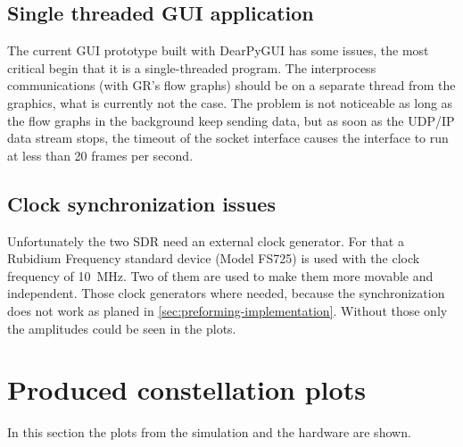 

\subsection{Single threaded GUI application} \label{sec:gui-issue-single-threaded}

The current GUI prototype built with DearPyGUI has some issues, the most critical begin that it is a single-threaded program. The interprocess communications (with GR's flow graphs) should be on a separate thread from the graphics, what is currently not the case. The problem is not noticeable as long as the flow graphs in the background keep sending data, but as soon as the UDP/IP data stream stops, the timeout of the socket interface causes the interface to run at less than 20 frames per second.

\subsection{Clock synchronization issues}

Unfortunately the two SDR need an external clock generator. For that a Rubidium Frequency standard device (Model FS725) is used with the clock frequency of \SI{10}{\mega\hertz}. Two of them are used to make them more movable and independent. Those clock generators  where needed, because the synchronization does not work as planed in \ref{sec:preforming-implementation}. 
Without those only the amplitudes could be seen in the plots. 



\section{Produced constellation plots}
In this section the plots from the simulation and the hardware are shown.


